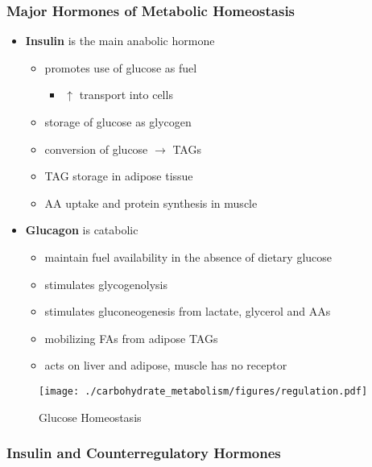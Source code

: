 \documentclass{scrartcl}
\begin{document}
\subsubsection{Major Hormones of Metabolic Homeostasis}
\label{sec:org0e400ce}
\begin{itemize}
\item \textbf{Insulin} is the main anabolic hormone
\begin{itemize}
\item promotes use of glucose as fuel
\begin{itemize}
\item \(\uparrow\) transport into cells
\end{itemize}
\item storage of glucose as glycogen
\item conversion of glucose \(\to\) TAGs
\item TAG storage in adipose tissue
\item AA uptake and protein synthesis in muscle
\end{itemize}
\item \textbf{Glucagon} is catabolic
\begin{itemize}
\item maintain fuel availability in the absence of dietary glucose
\item stimulates glycogenolysis
\item stimulates gluconeogenesis from lactate, glycerol and AAs
\item mobilizing FAs from adipose TAGs
\item acts on liver and adipose, muscle has no receptor
\end{itemize}
\end{itemize}

\begin{figure}[htbp]
\centering
\texttt{[image: ./carbohydrate\_metabolism/figures/regulation.pdf]}
\caption{\label{fig:org2a6032a}
Glucose Homeostasis}
\end{figure}

\subsubsection{Insulin and Counterregulatory Hormones}
\label{sec:org11cf0b8}
\end{document}
